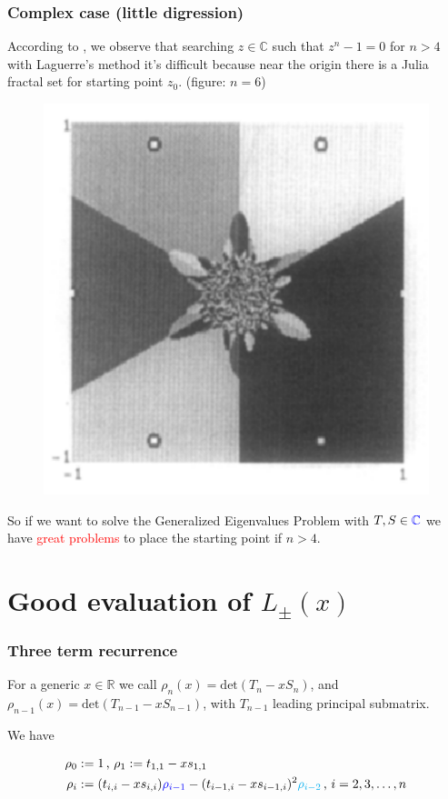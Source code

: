 \documentclass{beamer}
\newcommand{\R}{\mathbb{R}}
\newcommand{\C}{\mathbb{C}}
\newcommand{\deter}[1]{\mathrm{det}(#1)}
\newcommand{\tc}{ $ such that $ }
\theoremstyle{definition} \newtheorem{de}{Def}
\theoremstyle{remark} \newtheorem{os}[de]{Remark}
\theoremstyle{plain} \newtheorem{te}[de]{Teo}
\theoremstyle{plain} \newtheorem{co}[de]{Cor}
\theoremstyle{plain} \newtheorem{pr}[de]{Prop}
\theoremstyle{plain} \newtheorem{lem}[de]{Lemm}
\theoremstyle{remark} \newtheorem{rem}[de]{Remark}
\begin{document}
\begin{frame}[label=Julia]
  \frametitle{Complex case (little digression)}

  According to \cite{julia}, we observe that searching $z\in\C \tc z^n - 1 = 0$ for $n>4$ with Laguerre's method it's difficult because near the origin there is a Julia fractal set for starting point $z_0$. (figure: $n=6$)

\begin{figure}
  \centering
  \includegraphics[scale=0.3]{images/JuliaLaguerre.pdf}
\end{figure}

\pause

So if we want to solve the Generalized Eigenvalues Problem with $T,S\in\textcolor{blue}{\C}$ we have \textcolor{red}{great problems} to place the starting point if $n>4$. 

\end{frame}

\section{Good evaluation of $L_{\pm}(x)$}

\begin{frame}
  \frametitle{Three term recurrence}
  For a generic $x\in\R$ we call $\rho_n(x) = \deter{T_n-x S_n}$,
  and $\rho_{n-1}(x) = \deter{T_{n-1}-x S_{n-1}}$, with $T_{n-1}$ leading principal submatrix. 

  We have

  \begin{align*}
    \rho_0 &:= 1\, \text{, } \rho_1:=t_{1,1}- x s_{1,1} \\
    \rho_i &:= (t_{i,i}- x s_{i,i})\textcolor{blue}{\rho_{i-1}} - (t_{i-1,i}-x s_{i-1,i})^2 \textcolor{cyan}{\rho_{i-2}}\, \text{, } i=2,3,\dots,n
  \end{align*}

\end{frame}
\end{document}
